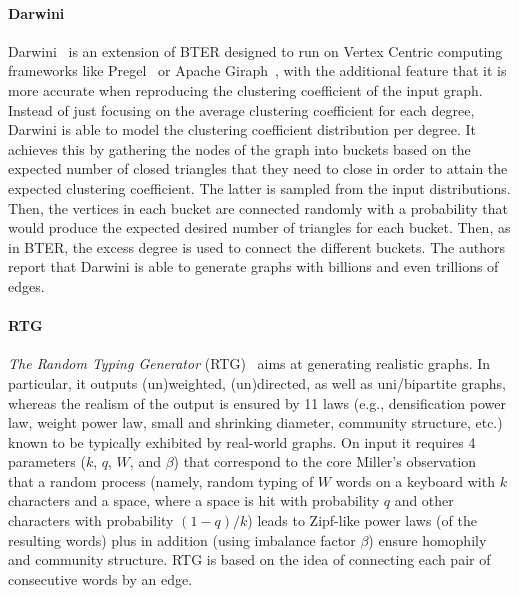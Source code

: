 \paragraph{Darwini} Darwini~\cite{edunov2016darwini} is an extension of BTER
designed to run on Vertex Centric computing frameworks like
Pregel~\cite{malewicz2010pregel} or Apache Giraph~\cite{ching2015one}, with the
additional feature that it is more accurate when reproducing the clustering
coefficient of the input graph. Instead of just focusing on the average
clustering coefficient for each degree, Darwini is able to model the clustering
coefficient distribution per degree. It achieves this by gathering the nodes
of the graph into buckets based on the expected number of closed triangles that they need
to close in order to attain the expected clustering coefficient. The latter is
sampled from the input distributions. Then, the vertices in each bucket are
connected randomly with a probability that would produce the expected
desired number of triangles for each bucket. Then, as in BTER, the excess degree
is used to connect the different buckets. The authors report that Darwini is
able to generate graphs with billions and even trillions of edges.


\paragraph{RTG} \emph{The Random Typing Generator} (RTG)~\cite{DBLP:journals/datamine/AkogluF09} aims at generating realistic graphs. In particular, it outputs (un)weighted, (un)directed, as well as uni/bipartite graphs, whereas the realism of the output is ensured by 11 laws (e.g., densification power law, weight power law, small and shrinking diameter, community structure, etc.) known to be typically exhibited by real-world graphs. On input it requires 4 parameters ($k$, $q$, $W$, and $\beta$) that correspond to the core Miller's observation~\cite{miller1957} that a random process (namely, random typing of $W$ words on a keyboard with $k$ characters and a space, where a space is hit with probability $q$ and other characters with probability $(1-q)/k$) leads to Zipf-like power laws (of the resulting words) plus in addition (using imbalance factor $\beta$) ensure homophily and community structure. RTG is based on the idea of connecting each pair of consecutive words by an edge.

